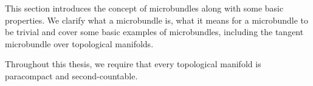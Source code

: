 \begin{myparagraph}
    This section introduces the concept of microbundles
    along with some basic properties.
    We clarify what a microbundle is, what it means for a microbundle to be trivial and 
    cover some basic examples of microbundles, including the tangent microbundle over topological manifolds.

    Throughout this thesis,
    we require that every topological manifold is paracompact and second-countable.
\end{myparagraph}








